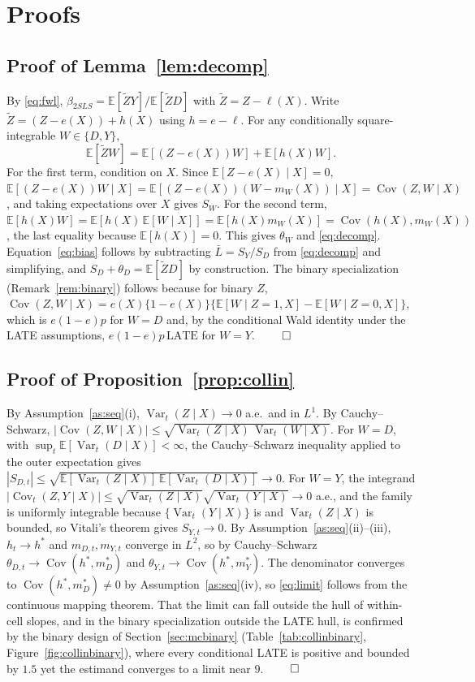 \documentclass[preprint,11pt,authoryear]{elsarticle}
\theoremstyle{definition}
\newcommand{\E}{\mathbb{E}}
\newcommand{\Cov}{\operatorname{Cov}}
\newcommand{\Var}{\operatorname{Var}}
\newcommand{\Ztil}{\tilde{Z}}
\newcommand{\late}{\mathrm{LATE}}
\begin{document}
\clearpage
\appendix
\section{Proofs}\label{app:proofs}

\subsection*{Proof of Lemma~\ref{lem:decomp}}
By \eqref{eq:fwl}, $\beta_{2SLS}=\E[\Ztil Y]/\E[\Ztil D]$ with $\Ztil=Z-\ell(X)$. Write
$\Ztil=(Z-e(X))+h(X)$ using $h=e-\ell$. For any conditionally square-integrable $W\in\{D,Y\}$,
\[
\E[\Ztil W]=\E[(Z-e(X))W]+\E[h(X)W].
\]
For the first term, condition on $X$. Since $\E[Z-e(X)\mid X]=0$,
$\E[(Z-e(X))W\mid X]=\E[(Z-e(X))(W-m_W(X))\mid X]=\Cov(Z,W\mid X)$, and taking expectations over $X$
gives $S_W$. For the second term, $\E[h(X)W]=\E[h(X)\,\E[W\mid X]]=\E[h(X)m_W(X)]=\Cov(h(X),m_W(X))$,
the last equality because $\E[h(X)]=0$. This gives $\theta_W$ and \eqref{eq:decomp}.
Equation~\eqref{eq:bias} follows by subtracting $\bar L=S_Y/S_D$ from \eqref{eq:decomp} and
simplifying, and $S_D+\theta_D=\E[\Ztil D]$ by construction. The binary specialization
(Remark~\ref{rem:binary}) follows because for binary $Z$,
$\Cov(Z,W\mid X)=e(X)\{1-e(X)\}\{\E[W\mid Z=1,X]-\E[W\mid Z=0,X]\}$, which is $e(1-e)p$ for $W=D$ and,
by the conditional Wald identity under the LATE assumptions, $e(1-e)p\,\late$ for $W=Y$. \hfill$\qed$

\subsection*{Proof of Proposition~\ref{prop:collin}}
By Assumption~\ref{as:seq}(i), $\Var_t(Z\mid X)\to0$ a.e.\ and in $L^1$. By Cauchy--Schwarz,
$|\Cov(Z,W\mid X)|\le\sqrt{\Var_t(Z\mid X)\,\Var_t(W\mid X)}$. For $W=D$, with
$\sup_t\E[\Var_t(D\mid X)]<\infty$, the Cauchy--Schwarz inequality applied to the outer expectation
gives $|S_{D,t}|\le\sqrt{\E[\Var_t(Z\mid X)]\,\E[\Var_t(D\mid X)]}\to0$. For $W=Y$, the integrand
$|\Cov_t(Z,Y\mid X)|\le\sqrt{\Var_t(Z\mid X)}\sqrt{\Var_t(Y\mid X)}\to0$ a.e., and the family is
uniformly integrable because $\{\Var_t(Y\mid X)\}$ is and $\Var_t(Z\mid X)$ is bounded, so Vitali's
theorem gives $S_{Y,t}\to0$. By Assumption~\ref{as:seq}(ii)--(iii), $h_t\to h^\ast$ and
$m_{D,t},m_{Y,t}$ converge in $L^2$, so by Cauchy--Schwarz $\theta_{D,t}\to\Cov(h^\ast,m_D^\ast)$ and
$\theta_{Y,t}\to\Cov(h^\ast,m_Y^\ast)$. The denominator converges to $\Cov(h^\ast,m_D^\ast)\neq0$ by
Assumption~\ref{as:seq}(iv), so \eqref{eq:limit} follows from the continuous mapping theorem. That the
limit can fall outside the hull of within-cell slopes, and in the binary specialization outside the
LATE hull, is confirmed by the binary design of Section~\ref{sec:mcbinary}
(Table~\ref{tab:collinbinary}, Figure~\ref{fig:collinbinary}), where every conditional LATE is
positive and bounded by $1.5$ yet the estimand converges to a limit near $9$. \hfill$\qed$
\end{document}
